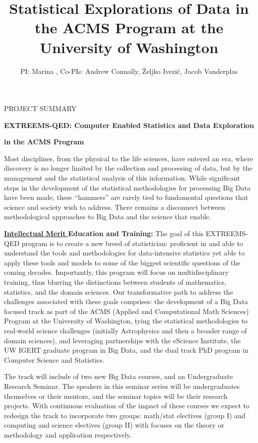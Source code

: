 \documentclass[nofootbib,floatfix,11pt]{article}
\title{Statistical Explorations of Data in the {ACMS} {Program} at the
  {University} of {Washington}}
\author{PI: Marina \meila, Co-PIs: Andrew Connolly, \v{Z}eljko Ivezi\'{c}, Jacob Vanderplas}
\newcommand{\comment}[1]{}
\begin{document}
\centerline{\large \sc     PROJECT SUMMARY}
\centerline{\large \bf EXTREEMS-QED: Computer Enabled Statistics and Data Exploration}
\centerline{\large \bf in the ACMS Program}

Most disciplines, from the physical to the life sciences, have entered
an era, where discovery is no longer limited by the collection and
processing of data, but by the management and the statistical analysis
of this information.\comment{Developments in instrumentation have led to
a tremendous increase in the magnitude of these data (resulting in a
focus on \emph{Big Data}).}  While significant steps in the development
of the statistical methodologies for processing Big Data have been
made, these ``hammers'' are rarely tied to fundamental questions that
science and society wish to address. There remains a disconnect
between methodological approaches to Big Data and the science that
enable.

\noindent\underline{{\bf Intellectual Merit} }
{\bf  Education and Training:}
The goal of this EXTREEMS-QED program is to create a new breed of
statistician: proficient in and able to understand the tools and
methodologies for data-intensive statistics yet able to apply these
tools and models to some of the biggest scientific questions of the
coming decades.  Importantly, this program will focus on
multidisciplinary training, thus blurring the distinctions between
students of mathematics, statistics, and the domain sciences.  Our
transformative path to address the challenges associated with these
goals comprises: the development of a Big Data focused track as part of the
ACMS (Applied and Computational Math Sciences) Program at the
University of Washington, tying the statistical methodologies to
real-world science challenges (initially Astrophysics and then a
broader range of domain sciences), and leveraging partnerships with
the eScience Institute, the UW IGERT graduate program in Big Data, and
the dual track PhD program in Computer Science and Statistics.

The track will include of two new Big Data courses, and an
Undergraduate Research Seminar. The speakers in this seminar series
will be undergraduates themselves or their mentors, and the seminar
topics will be their research projects. With continuous evaluation of
the impact of these courses we expect to redesign the track to
incorporate two groups: math/stat electives (group I) and computing
and science electives (group II) with focuses on the theory or
methodology and application respectively.
\end{document}
